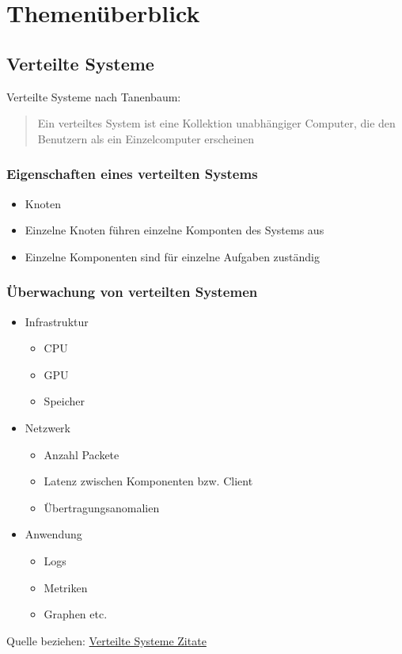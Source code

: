 %

\chapter{Themenüberblick}

\section{Verteilte Systeme}

Verteilte Systeme nach Tanenbaum:

\begin{quote}
	Ein verteiltes System ist eine Kollektion unabhängiger Computer, die den Benutzern als ein Einzelcomputer erscheinen 
\end{quote}

\subsection{Eigenschaften eines verteilten Systems}
\begin{itemize}
	\item Knoten
	\item Einzelne Knoten führen einzelne Komponten des Systems aus 
	\item Einzelne Komponenten sind für einzelne Aufgaben zuständig
\end{itemize}
\subsection{Überwachung von verteilten Systemen}
\begin{itemize}
	\item Infrastruktur
	\begin{itemize}
		\item CPU
		\item GPU
		\item Speicher
	\end{itemize}
	\item Netzwerk
	\begin{itemize}
		\item Anzahl Packete
		\item Latenz zwischen Komponenten bzw. Client
		\item Übertragungsanomalien
	\end{itemize}
	\item Anwendung
	\begin{itemize}
		\item Logs
		\item Metriken
		\item Graphen etc. 
	\end{itemize}
\end{itemize}
Quelle beziehen:
\href{https://de.wikipedia.org/wiki/Verteiltes_System}{Verteilte Systeme Zitate}
